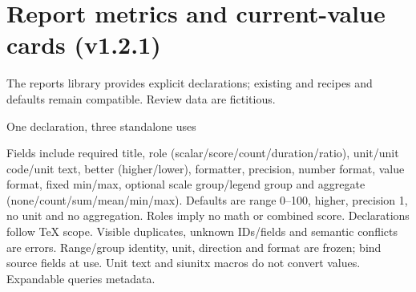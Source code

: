 \section{Report metrics and current-value cards (v1.2.1)}
The reports library provides explicit declarations; existing \key{\gradmetric} and \key{\gradmetriccolumn} recipes and defaults remain compatible. Review data are fictitious.
\begin{demo}{One declaration, three standalone uses}
\begingroup
{}
\quad
{}\par\medskip
{}\par\medskip
{}
\endgroup
\end{demo}
Fields include required title, role (scalar/score/count/duration/ratio), unit/unit code/unit text, better (higher/lower), formatter, precision, number format, value format, fixed min/max, optional scale group/legend group and aggregate (none/count/sum/mean/min/max). Defaults are range 0--100, higher, precision 1, no unit and no aggregation. Roles imply no math or combined score.
Declarations follow TeX scope. Visible duplicates, unknown IDs/fields and semantic conflicts are errors. Range/group identity, unit, direction and format are frozen; bind source fields at use. Unit text and siunitx macros do not convert values. Expandable  queries metadata.
\clearpage
